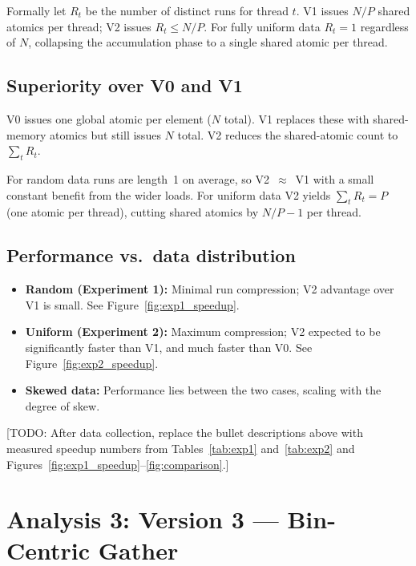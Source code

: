 \documentclass[11pt, letterpaper]{article}
\begin{document}
Formally let $R_t$ be the number of distinct runs for thread $t$.
V1 issues $N/P$ shared atomics per thread; V2 issues $R_t \leq N/P$.
For fully uniform data $R_t = 1$ regardless of $N$, collapsing the
accumulation phase to a single shared atomic per thread.

\subsection*{Superiority over V0 and V1}

V0 issues one global atomic per element ($N$ total).
V1 replaces these with shared-memory atomics but still issues $N$ total.
V2 reduces the shared-atomic count to $\sum_t R_t$.

For random data runs are length~1 on average, so V2~$\approx$~V1 with
a small constant benefit from the wider loads.  For uniform data V2 yields
$\sum_t R_t = P$ (one atomic per thread), cutting shared atomics by
$N/P - 1$ per thread.

\subsection*{Performance vs.\ data distribution}

\begin{itemize}[noitemsep]
  \item \textbf{Random (Experiment 1):} Minimal run compression; V2
        advantage over V1 is small.  See Figure~\ref{fig:exp1_speedup}.
  \item \textbf{Uniform (Experiment 2):} Maximum compression;
        V2 expected to be significantly faster than V1, and much faster
        than V0.  See Figure~\ref{fig:exp2_speedup}.
  \item \textbf{Skewed data:} Performance lies between the two cases,
        scaling with the degree of skew.
\end{itemize}

[TODO: After data collection, replace the bullet descriptions above with
measured speedup numbers from Tables~\ref{tab:exp1} and~\ref{tab:exp2}
and Figures~\ref{fig:exp1_speedup}--\ref{fig:comparison}.]

\section{Analysis 3: Version 3 — Bin-Centric Gather}
\end{document}

